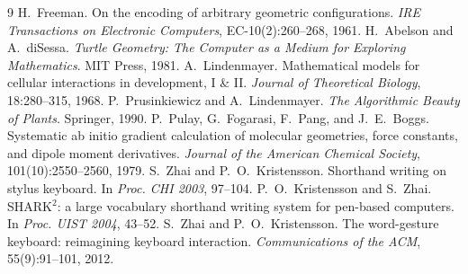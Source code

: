 \documentclass[11pt]{article}
\begin{document}
\begin{thebibliography}{9}
 H.~Freeman. On the encoding of arbitrary geometric configurations.
  \emph{IRE Transactions on Electronic Computers}, EC-10(2):260--268, 1961.
 H.~Abelson and A.~diSessa. \emph{Turtle Geometry: The Computer as a
  Medium for Exploring Mathematics}. MIT Press, 1981.
 A.~Lindenmayer. Mathematical models for cellular interactions in
  development, I \& II. \emph{Journal of Theoretical Biology}, 18:280--315, 1968.
 P.~Prusinkiewicz and A.~Lindenmayer. \emph{The Algorithmic Beauty of
  Plants}. Springer, 1990.
 P.~Pulay, G.~Fogarasi, F.~Pang, and J.~E.~Boggs. Systematic ab initio
  gradient calculation of molecular geometries, force constants, and dipole moment
  derivatives. \emph{Journal of the American Chemical Society}, 101(10):2550--2560, 1979.
 S.~Zhai and P.~O.~Kristensson. Shorthand writing on stylus keyboard. In
  \emph{Proc. CHI 2003}, 97--104.
 P.~O.~Kristensson and S.~Zhai. SHARK$^2$: a large vocabulary
  shorthand writing system for pen-based computers. In \emph{Proc. UIST 2004}, 43--52.
 S.~Zhai and P.~O.~Kristensson. The word-gesture keyboard: reimagining
  keyboard interaction. \emph{Communications of the ACM}, 55(9):91--101, 2012.
\end{thebibliography}
\end{document}
